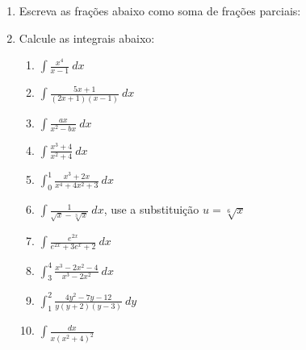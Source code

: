 \documentclass[a4paper,5pt]{amsbook}
\begin{document}
\vspace{1cm}
\begin{enumerate}
	\vspace{0.5cm}
	\item Escreva as frações abaixo como soma de frações parciais:

		\vspace{0.3cm}

	\vspace{0.5cm}
	\item Calcule as integrais abaixo:
		\begin{enumerate}
			\vspace{0.3cm}
			\item $\displaystyle\int\frac{x^4}{x-1}\ dx$
			\vspace{0.3cm}
			\item $\displaystyle\int\frac{5x+1}{(2x+1)(x-1)}\ dx$
			\vspace{0.3cm}
			\item $\displaystyle\int\frac{ax}{x^2-bx}\ dx$
			\vspace{0.3cm}
			\item $\displaystyle\int\frac{x^3+4}{x^2+4}\ dx$
			\vspace{0.3cm}
			\item $\displaystyle\int_0^1\frac{x^3+2x}{x^4+4x^2+3}\ dx$
			\vspace{0.3cm}
			\item $\displaystyle\int\frac{1}{\sqrt{x}-\sqrt[3]{x}}\ dx$, use a substituição $u=\sqrt[6]{x}$
			\vspace{0.3cm}
			\item $\displaystyle\int\frac{e^{2x}}{e^{2x}+3e^x+2}\ dx$
			\vspace{0.3cm}
			\item $\displaystyle\int_3^4\frac{x^3-2x^2-4}{x^3-2x^2}\ dx$
			\vspace{0.3cm}
			\item $\displaystyle\int_1^2\frac{4y^2-7y-12}{y(y+2)(y-3)}\ dy$
			\vspace{0.3cm}
			\item $\displaystyle\int\frac{dx}{x(x^2+4)^2}$
		\end{enumerate}


\end{enumerate}
\end{document}

